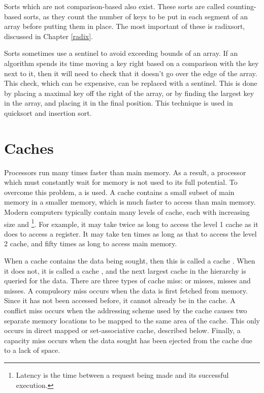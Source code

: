 Sorts which are not comparison-based also exist. These sorts are called
counting-based sorts, as they count the number of keys to be put in each segment
of an array before putting them in place. The most important of these is
radixsort, discussed in Chapter \ref{radix}.

Sorts sometimes use a sentinel to avoid exceeding bounds of an array. If an
algorithm spends its time moving a key right based on a comparison with the key
next to it, then it will need to check that it doesn't go over the edge of the
array. This check, which can be expensive, can be replaced with a sentinel. This
is done by placing a maximal key off the right of the array, or by finding the
largest key in the array, and placing it in the final position. This technique
is used in quicksort and insertion sort.

\section{Caches}
Processors run many times faster than main memory. As a result, a processor
which must constantly wait for memory is not used to its full potential. To
overcome this problem, a  is used. A cache contains a small
subset of main memory in a smaller memory, which is much faster to access than
main memory. Modern computers typically contain many levels of cache, each with
increasing size and \footnote{Latency is the time between a request
being made and its successful execution.}. For example, it may take twice as
long to access the level 1 cache as it does to access a register. It may take
ten times as long as that to access the level 2 cache, and fifty times as long
to access main memory.

When a cache contains the data being sought, then this is called a cache
. When it does not, it is called a cache , and the next largest
cache in the hierarchy is queried for the data. There are three types of cache
miss:  or  misses,  misses and
 misses. A compulsory miss occurs when the data is first fetched
from memory. Since it has not been accessed before, it cannot already be in the
cache. A conflict miss occurs when the addressing scheme used by the cache
causes two separate memory locations to be mapped to the same area of the cache.
This only occurs in direct mapped or set-associative cache, described below.
Finally, a capacity miss occurs when the data sought has been ejected from the
cache due to a lack of space.


